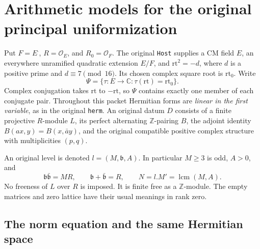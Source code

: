 \section{Arithmetic models for the original principal uniformization}
\label{sec:principal-uniformization-v48}


Put \(F=E^{\bar{\ } }\), \(R=\mathcal O_E\), and
\(R_0=\mathcal O_F\).  The original \texttt{Host} supplies a CM field
\(E\), an everywhere unramified quadratic extension \(E/F\), and
\(\mathrm{rt}^2=-d\), where \(d\) is a positive prime and
\(d\equiv7\pmod {16}\).  Its chosen complex square root is
\(\mathrm{rt}_0\).  Write
\[
 \Psi=\{\tau:E\longrightarrow\mathbb C:
                       \tau(\mathrm{rt})=\mathrm{rt}_0\}.
 \tag{PUN.1}
\]
Complex conjugation takes \(\mathrm{rt}\) to \(-\mathrm{rt}\), so
\(\Psi\) contains exactly one member of each conjugate pair.
Throughout this packet Hermitian forms are \emph{linear in the first
variable}, as in the original \texttt{herm}.  An original datum
\(D\) consists of a finite projective \(R\)-module \(L\), its perfect
alternating \(\mathbb Z\)-pairing \(B\), the adjoint identity
\(B(ax,y)=B(x,\bar a y)\), and the original compatible positive
complex structure with multiplicities \((p,q)\).

An original level is denoted \(l=(M,\mathfrak b,A)\).  In particular
\(M\ge3\) is odd, \(A>0\), and
\[
 \mathfrak b\bar{\mathfrak b}=MR,\qquad
 \mathfrak b+\bar{\mathfrak b}=R,\qquad
                  N=l.M'=\operatorname{lcm}(M,A).
 \tag{PUN.2}
\]
No freeness of \(L\) over \(R\) is imposed.  It is finite free as a
\(\mathbb Z\)-module.  The empty matrices and zero lattice have their
usual meanings in rank zero.

\subsection{The norm equation and the same Hermitian space}


